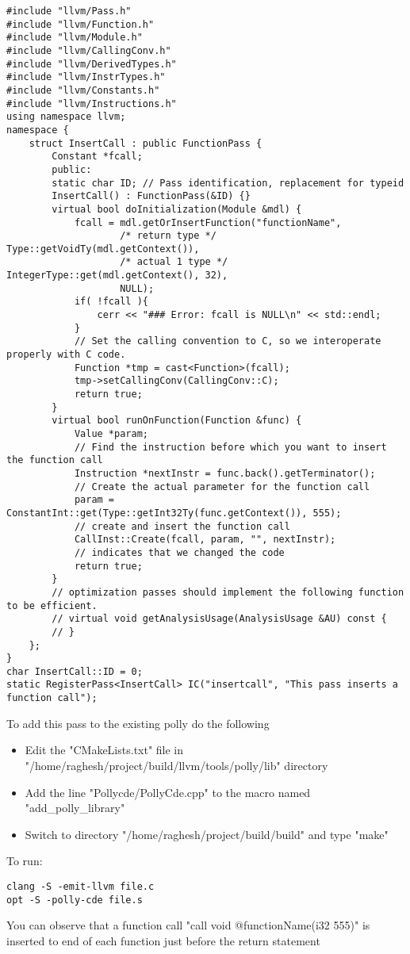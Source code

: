 \documentclass[a4paper,10pt]{article}
\begin{document}
\begin{verbatim}
#include "llvm/Pass.h"
#include "llvm/Function.h"
#include "llvm/Module.h"
#include "llvm/CallingConv.h"
#include "llvm/DerivedTypes.h"
#include "llvm/InstrTypes.h"
#include "llvm/Constants.h"
#include "llvm/Instructions.h"
using namespace llvm;
namespace {
    struct InsertCall : public FunctionPass {
        Constant *fcall;
        public:
        static char ID; // Pass identification, replacement for typeid
        InsertCall() : FunctionPass(&ID) {}
        virtual bool doInitialization(Module &mdl) {
            fcall = mdl.getOrInsertFunction("functionName",
                    /* return type */     Type::getVoidTy(mdl.getContext()),
                    /* actual 1 type */   IntegerType::get(mdl.getContext(), 32),
                    NULL);
            if( !fcall ){
                cerr << "### Error: fcall is NULL\n" << std::endl;
            }
            // Set the calling convention to C, so we interoperate properly with C code.
            Function *tmp = cast<Function>(fcall);
            tmp->setCallingConv(CallingConv::C);
            return true;
        }
        virtual bool runOnFunction(Function &func) {
            Value *param;
            // Find the instruction before which you want to insert the function call
            Instruction *nextInstr = func.back().getTerminator();
            // Create the actual parameter for the function call
            param = ConstantInt::get(Type::getInt32Ty(func.getContext()), 555);
            // create and insert the function call
            CallInst::Create(fcall, param, "", nextInstr);
            // indicates that we changed the code
            return true;
        }
        // optimization passes should implement the following function to be efficient.
        // virtual void getAnalysisUsage(AnalysisUsage &AU) const {
        // }
    };
}
char InsertCall::ID = 0;
static RegisterPass<InsertCall> IC("insertcall", "This pass inserts a function call");
\end{verbatim}
To add this pass to the existing polly do the following

\begin{itemize}
\item Edit the "CMakeLists.txt" file in "/home/raghesh/project/build/llvm/tools/polly/lib" directory
\item Add the line "Pollycde/PollyCde.cpp" to the macro named "add\_polly\_library"
\item Switch to directory "/home/raghesh/project/build/build" and type "make"
\end{itemize}
To run:
\begin{verbatim}
clang -S -emit-llvm file.c
opt -S -polly-cde file.s
\end{verbatim}
You can observe that a function call "call void @functionName(i32 555)" is inserted to end of each function 
just before the return statement
\end{document}
